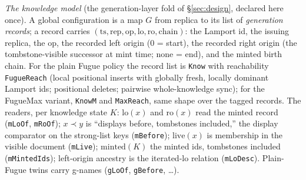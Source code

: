 \documentclass[11pt]{article}
\newcommand{\lean}[1]{\texttt{#1}}
\begin{document}
\emph{The knowledge model} (the generation-layer fold of
\S\ref{sec:design}, declared here once). A global configuration is a
map $G$ from replica to its list of \emph{generation records}; a
record carries $(\mathrm{ts}, \mathrm{rep}, \mathrm{op},
\mathrm{lo}, \mathrm{ro}, \mathrm{chain})$: the Lamport id, the
issuing replica, the op, the recorded left origin ($0$ = start), the
recorded right origin (the tombstone-visible successor at mint time;
none = end), and the minted birth chain. For the plain Fugue policy
the record list is \lean{Know} with reachability \lean{FugueReach}
(local positional inserts with globally fresh, locally dominant
Lamport ids; positional deletes; pairwise whole-knowledge sync); for
the FugueMax variant, \lean{KnowM} and \lean{MaxReach}, same shape
over the tagged records. The readers, per knowledge state $K$:
$\mathrm{lo}(x)$ and $\mathrm{ro}(x)$ read the minted record
(\lean{mLoOf}, \lean{mRoOf}); $x \prec y$ is ``displays before,
tombstones included,'' the display comparator on the strong-list
keys (\lean{mBefore}); $\mathrm{live}(x)$ is membership in the
visible document (\lean{mLive}); $\mathrm{minted}(K)$ the minted
ids, tombstones included (\lean{mMintedIds}); left-origin ancestry
is the iterated-$\mathrm{lo}$ relation (\lean{mLoDesc}). Plain-Fugue
twins carry g-names (\lean{gLoOf}, \lean{gBefore}, \dots).
\end{document}
